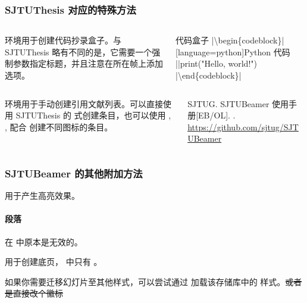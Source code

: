 \begin{frame}[fragile]
  \frametitle{SJTUThesis 对应的特殊方法}
  \begin{columns}
    \begin{column}{0.55\textwidth}
       环境用于创建代码抄录盒子。与 SJTUThesis 略有不同的是，它需要一个强制参数指定标题，并且注意在所在帧上添加  选项。
    \end{column}
    \begin{column}{0.45\textwidth}
      \begin{codeblock}{代码盒子}
|\textbackslash{}begin\{codeblock\}|[language=python]{Python 代码}
||print("Hello, world!")
|\textbackslash{}end\{codeblock\}|
      \end{codeblock}
    \end{column}
  \end{columns}


  \begin{columns}
    \begin{column}{0.55\textwidth}
       环境用于手动创建引用文献列表。可以直接使用 SJTUThesis 的  式创建条目，也可以使用 , ,  配合  创建不同图标的条目。
    \end{column}
    \begin{column}{0.45\textwidth}
      \begin{bibliolist}{00}
        \onlineitem SJTUG.
        \newblock SJTUBeamer 使用手册[EB/OL].
        . \url{https://github.com/sjtug/SJTUBeamer}
      \end{bibliolist}
    \end{column}
  \end{columns}


\end{frame}

\begin{frame}
  \frametitle{SJTUBeamer 的其他附加方法}
    用于产生高亮效果。
  
  \paragraph{段落}  在  中原本是无效的。

  \vspace*{0.25em}

   用于创建底页， 中只有 。

  \vspace*{1em}

  如果你需要迁移幻灯片至其他样式，可以尝试通过  加载该存储库中的  样式。\sout{或者是直接改个徽标}
\end{frame}

